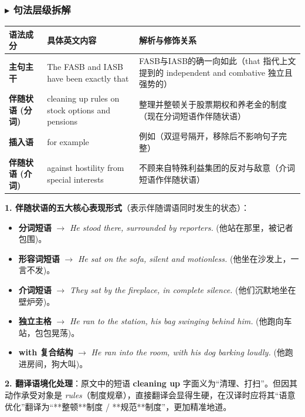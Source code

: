 \documentclass[cn,normal,11pt]{elegantnote}
\begin{document}
\subsubsection*{$\blacktriangleright$ 句法层级拆解}
\noindent
\begin{tabularx}{\textwidth}{p{3.2cm} X X}
  \toprule
  \textbf{语法成分} & \textbf{具体英文内容} & \textbf{解析与修饰关系} \\
  \midrule
  \textbf{主句主干} & The FASB and IASB have been exactly that & FASB与IASB的确一向如此（that 指代上文提到的 independent and combative 独立且强势的） \\
  \midrule
  \textbf{伴随状语 (分词)} & cleaning up rules on stock options and pensions & 整理并整顿关于股票期权和养老金的制度（现在分词短语作伴随状语） \\
  \midrule
  \textbf{插入语} & for example & 例如（双逗号隔开，移除后不影响句子完整） \\
  \midrule
  \textbf{伴随状语 (介词)} & against hostility from special interests & 不顾来自特殊利益集团的反对与敌意（介词短语作伴随状语） \\
  \bottomrule
\end{tabularx}

\begin{proposition}[伴随状语的五大语法形式与翻译翻译]
  \textbf{1. 伴随状语的五大核心表现形式}（表示伴随谓语同时发生的状态）：
  \begin{itemize}
    \item \textbf{分词短语} $\rightarrow$ \textit{He stood there, surrounded by reporters.} (他站在那里，被记者包围)。
    \item \textbf{形容词短语} $\rightarrow$ \textit{He sat on the sofa, silent and motionless.} (他坐在沙发上，一言不发)。
    \item \textbf{介词短语} $\rightarrow$ \textit{They sat by the fireplace, in complete silence.} (他们沉默地坐在壁炉旁)。
    \item \textbf{独立主格} $\rightarrow$ \textit{He ran to the station, his bag swinging behind him.} (他跑向车站，包包晃荡)。
    \item \textbf{with 复合结构} $\rightarrow$ \textit{He ran into the room, with his dog barking loudly.} (他跑进房间，狗大叫)。
  \end{itemize}
  \textbf{2. 翻译语境化处理}：原文中的短语 \textbf{cleaning up} 字面义为“清理、打扫”。但因其动作承受对象是 \textit{rules}（制度规章），直接翻译会显得生硬，在汉译时应将其“语意优化”翻译为“**整顿**制度 / **规范**制度”，更加精准地道。
\end{proposition}
\end{document}
